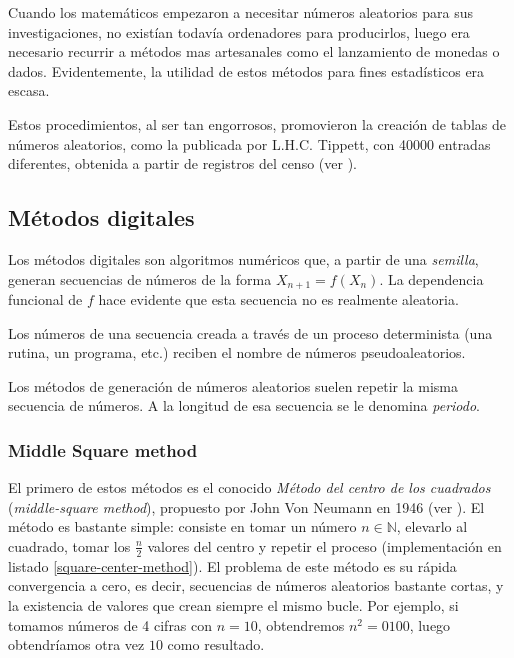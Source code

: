 Cuando los matemáticos empezaron a necesitar números aleatorios para sus investigaciones, no existían todavía ordenadores para producirlos, luego era necesario recurrir a métodos mas artesanales como el lanzamiento de monedas o dados. Evidentemente, la utilidad de estos métodos para fines estadísticos era escasa.

Estos procedimientos, al ser tan engorrosos, promovieron la creación de tablas de números aleatorios, como la publicada por L.H.C. Tippett, con 40000 entradas diferentes, obtenida a partir de registros del censo (ver \cite{Tippett}).

\subsection{Métodos digitales}

Los métodos digitales son algoritmos numéricos que, a partir de una \textit{semilla}, generan secuencias de números de la forma $X_{n+1}=f(X_n)$. La dependencia funcional de $f$ hace evidente que esta secuencia no es realmente aleatoria.

\begin{definition}
Los números de una secuencia creada a través de un proceso determinista (una rutina, un programa, etc.) reciben el nombre de números pseudoaleatorios.
\end{definition}

Los métodos de generación de números aleatorios suelen repetir la misma secuencia de números. A la longitud de esa secuencia se le denomina \textit{periodo}.

\subsubsection{Middle Square method}

El primero de estos métodos es el conocido \textit{Método del centro de los cuadrados} (\textit{middle-square method}), propuesto por John Von Neumann en 1946 (ver \cite{von195113}). El método es bastante simple: consiste en tomar un número $n\in\mathbb{N}$, elevarlo al cuadrado, tomar los $\frac{n}{2}$ valores del centro y repetir el proceso (implementación en listado \ref{square-center-method}).  El problema de este método es su rápida convergencia a cero, es decir, secuencias de números aleatorios bastante cortas, y la existencia de valores que crean siempre el mismo bucle. Por ejemplo, si tomamos números de 4 cifras con $n=10$, obtendremos $n^2=0100$, luego obtendríamos otra vez $10$ como resultado.

